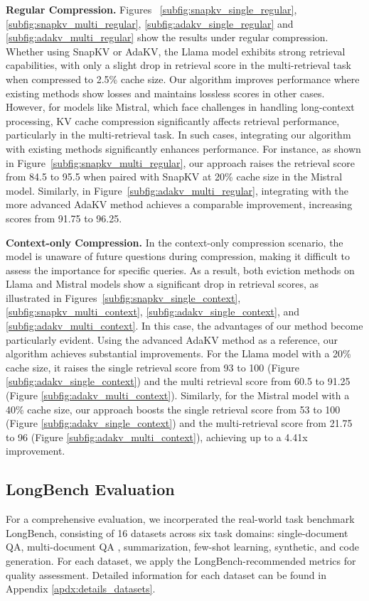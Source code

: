 \textbf{Regular Compression.}
Figures ~\ref{subfig:snapkv_single_regular}, \ref{subfig:snapkv_multi_regular}, \ref{subfig:adakv_single_regular} and \ref{subfig:adakv_multi_regular} show the results under regular compression. Whether using SnapKV or AdaKV, the Llama model exhibits strong retrieval capabilities, with only a slight drop in retrieval score in the multi-retrieval task when compressed to 2.5\% cache size. Our algorithm improves performance where existing methods show losses and maintains lossless scores in other cases. 
However, for models like Mistral, which face challenges in handling long-context processing, KV cache compression significantly affects retrieval performance, particularly in the multi-retrieval task. In such cases, integrating our algorithm with existing methods significantly enhances performance.
For instance, as shown in Figure~\ref{subfig:snapkv_multi_regular}, our approach raises the retrieval score from 84.5 to 95.5 when paired with SnapKV at 20\% cache size in the Mistral model. Similarly, in Figure~\ref{subfig:adakv_multi_regular}, integrating with the more advanced AdaKV method achieves a comparable improvement, increasing scores from 91.75 to 96.25.



\textbf{Context-only Compression.}
In the context-only compression scenario, the model is unaware of future questions during compression, making it difficult to assess the importance for specific queries. As a result, both eviction methods on Llama and Mistral models show a significant drop in retrieval scores, as illustrated in Figures~\ref{subfig:snapkv_single_context}, \ref{subfig:snapkv_multi_context}, \ref{subfig:adakv_single_context}, and \ref{subfig:adakv_multi_context}. In this case, the advantages of our method become particularly evident.
Using the advanced AdaKV method as a reference, our algorithm achieves substantial improvements. For the Llama model with a 20\% cache size, it raises the single retrieval score from 93 to 100 (Figure \ref{subfig:adakv_single_context}) and the multi retrieval score from 60.5 to 91.25 (Figure \ref{subfig:adakv_multi_context}). Similarly, for the Mistral model with a 40\% cache size, our approach boosts the single retrieval score from 53 to 100 (Figure \ref{subfig:adakv_single_context}) and the multi-retrieval score from 21.75 to 96 (Figure \ref{subfig:adakv_multi_context}), achieving up to a 4.41x improvement.


\subsection{LongBench Evaluation}
For a comprehensive evaluation, we incorperated the real-world task benchmark LongBench, consisting of 16 datasets across six task domains: single-document QA, multi-document QA , summarization, few-shot learning, synthetic, and code generation.  For each dataset, we apply the LongBench-recommended metrics for quality assessment. Detailed information for each dataset can be found in Appendix \ref{apdx:details_datasets}.

